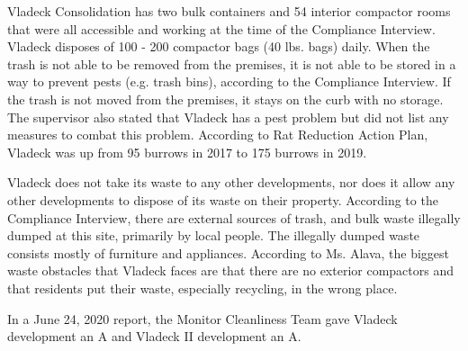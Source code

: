 Vladeck Consolidation has two bulk containers and 54 interior compactor rooms that were all accessible and working at the time of the Compliance Interview. Vladeck disposes of 100 - 200 compactor bags (40 lbs. bags) daily. When the trash is not able to be removed from the premises, it is not able to be stored in a way to prevent pests (e.g. trash bins), according to the Compliance Interview. If the trash is not moved from the premises, it stays on the curb with no storage. The supervisor also stated that Vladeck has a pest problem but did not list any measures to combat this problem. According to Rat Reduction Action Plan, Vladeck was up from 95 burrows in 2017 to 175 burrows in 2019.

Vladeck does not take its waste to any other developments, nor does it allow any other developments to dispose of its waste on their property. According to the Compliance Interview, there are external sources of trash, and bulk waste illegally dumped at this site, primarily by local people. The illegally dumped waste consists mostly of furniture and appliances. According to Ms. Alava, the biggest waste obstacles that Vladeck faces are that there are no exterior compactors and that residents put their waste, especially recycling, in the wrong place.

In a June 24, 2020 report, the Monitor Cleanliness Team gave Vladeck development an A and Vladeck II development an A.